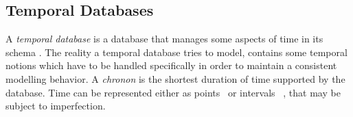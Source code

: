 %



\subsection{Temporal Databases}
A \emph{temporal database} is a database that manages some aspects of time in its schema \cite{Dyreson1994}. The reality a temporal database tries to model, contains some temporal notions which have to be handled specifically in order to maintain a consistent modelling behavior. A \emph{chronon} is the shortest duration of time supported by the database. Time can be represented either as points~\cite{Dubois89} or intervals ~\cite{Garrido2009},\cite{655777} that may be subject to imperfection.



